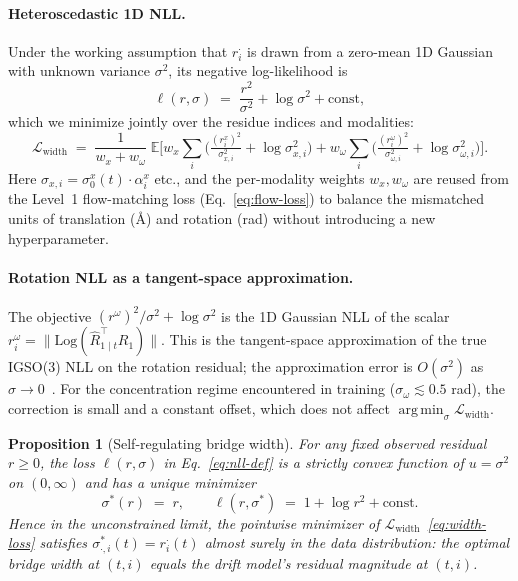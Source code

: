 \documentclass{article}
\newtheorem{proposition}{Proposition}
\theoremstyle{remark}
\theoremstyle{definition}
\newcommand{\E}{\mathbb{E}}
\newcommand{\Log}{\mathrm{Log}}
\DeclareMathOperator*{\argmin}{arg\,min}
\begin{document}
\paragraph{Heteroscedastic 1D NLL.}
Under the working assumption that $r^{\cdot}_i$ is drawn from a zero-mean 1D
Gaussian with unknown variance $\sigma^2$, its negative log-likelihood is
\begin{equation}
\ell(r,\sigma)\;=\;\frac{r^2}{\sigma^2}+\log\sigma^2+\text{const},
\label{eq:nll-def}
\end{equation}
which we minimize jointly over the residue indices and modalities:
\begin{equation}
\mathcal{L}_{\text{width}}\;=\;
\frac{1}{w_x+w_\omega}\;
\E\!\Bigg[
  w_x\sum_i\!\Big(\tfrac{(r^x_i)^2}{\sigma_{x,i}^2}+\log\sigma_{x,i}^2\Big)
 +w_\omega\sum_i\!\Big(\tfrac{(r^\omega_i)^2}{\sigma_{\omega,i}^2}+\log\sigma_{\omega,i}^2\Big)
\Bigg].
\label{eq:width-loss}
\end{equation}
Here $\sigma_{x,i}=\sigma^x_0(t)\cdot\alpha^x_i$ etc., and the per-modality
weights $w_x,w_\omega$ are reused from the Level~1 flow-matching loss
(Eq.~\ref{eq:flow-loss}) to balance the mismatched units of translation
(\AA) and rotation (rad) without introducing a new hyperparameter.

\paragraph{Rotation NLL as a tangent-space approximation.}
The objective $(r^\omega)^2/\sigma^2+\log\sigma^2$ is the 1D Gaussian NLL of
the scalar $r^\omega_i=\|\Log(\hat{R}_{1\mid t}^\top R_1)\|$. This is the
tangent-space approximation of the true IGSO(3) NLL on the rotation residual;
the approximation error is $O(\sigma^2)$ as
$\sigma\to 0$~\citep{nikolayev1997igso3}. For the concentration regime
encountered in training ($\sigma_\omega\!\lesssim\!0.5$ rad), the correction is
small and a constant offset, which does not affect
$\argmin_\sigma\mathcal{L}_{\text{width}}$.

\begin{proposition}[Self-regulating bridge width]
\label{prop:self-reg}
For any fixed observed residual $r\geq 0$, the loss $\ell(r,\sigma)$ in
Eq.~\eqref{eq:nll-def} is a strictly convex function of $u=\sigma^2$ on
$(0,\infty)$ and has a unique minimizer
\[
\sigma^{\ast}(r)\;=\;r,\qquad
\ell(r,\sigma^{\ast})\;=\;1+\log r^2+\text{const}.
\]
Hence in the unconstrained limit, the pointwise minimizer of
$\mathcal{L}_{\text{width}}$~\eqref{eq:width-loss} satisfies
$\sigma^{\ast}_{\cdot,i}(t)=r^{\cdot}_i(t)$ almost surely in the data
distribution: \emph{the optimal bridge width at $(t,i)$ equals the drift
model's residual magnitude at $(t,i)$.}
\end{proposition}
\end{document}
